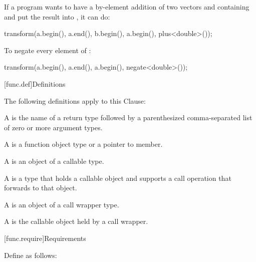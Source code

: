 \pnum
\begin{example}
If a \Cpp{} program wants to have a by-element addition of two vectors 
and  containing  and put the result into ,
it can do:

\begin{codeblock}
transform(a.begin(), a.end(), b.begin(), a.begin(), plus<double>());
\end{codeblock}
\end{example}

\pnum
\begin{example}
To negate every element of :

\begin{codeblock}
transform(a.begin(), a.end(), a.begin(), negate<double>());
\end{codeblock}

\end{example}

[func.def]{Definitions}

\pnum
The following definitions apply to this Clause:

\pnum
A  is the name of a return type followed by a
parenthesized comma-separated list of zero or more argument types.

\pnum
A  is a function object type or a pointer to member.

\pnum
A  is an object of a callable type.

\pnum
A  is a type that holds a callable object
and supports a call operation that forwards to that object.

\pnum
A  is an object of a call wrapper type.

\pnum
A  is the callable object held by a call wrapper.

[func.require]{Requirements}

\pnum
{}%
Define  as follows:

